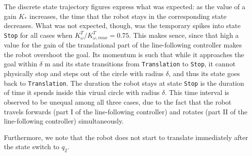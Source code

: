The discrete state trajectory figures express what was expected: as the value
of a gain $K_{*}$ increases, the time that the robot stays in the corresponding
state decreases. What was not expected, though, was the temporary spikes into
state \texttt{Stop} for all cases when $K_{\omega}^T / K_{\omega,max}^T = 0.75$.
This makes sence, since that high a value for the gain of the translational
part of the line-following controller makes the robot overshoot the goal. Its
momentum is such that while it approaches the goal within $\delta$ m and its
state transitions from \texttt{Translation} to \texttt{Stop}, it cannot physically
stop and steps out of the circle with radius $\delta$, and thus its state goes back
to \texttt{Translation}. The duration the robot stays at state \texttt{Stop} is
the duration of time it spends inside this virual circle with radius $\delta$.
This time interval is observed to be unequal among all three cases, due to the
fact that the robot travels forwards (part I of the line-following controller)
and rotates (part II of the line-following controller) simultaneously.

Furthermore, we note that the robot does not start to translate immediately after
the state switch to $q_2$.


\begin{figure}[ht]
\begin{multicols}{2}
\quad
{}

\quad
{}

\quad
{}

\end{multicols}
\caption{}
\label{multifig:19_1}
\end{figure}

